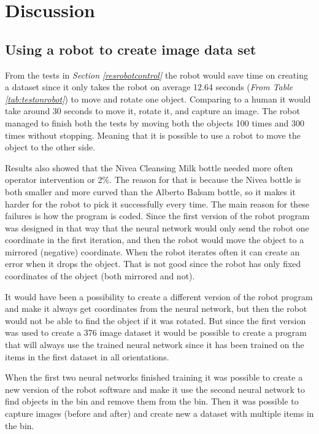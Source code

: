 \chapter{Discussion}

\section{Using a robot to create image data set}
From the tests in \textit{Section \ref{resrobotcontrol}} the robot would save time on creating a dataset since it only takes the robot on average 12.64 seconds (\textit{From Table \ref{tab:testonrobot}}) to move and rotate one object. Comparing to a human it would take around 30 seconds to move it, rotate it, and capture an image. The robot managed to finish both the tests by moving both the objects 100 times and 300 times without stopping. Meaning that it is possible to use a robot to move the object to the other side. 

Results also showed that the Nivea Cleansing Milk bottle needed more often operator intervention or 2\%. The reason for that is because the Nivea bottle is both smaller and more curved than the Alberto Balsam bottle, so it makes it harder for the robot to pick it successfully every time. The main reason for these failures is how the program is coded. Since the first version of the robot program was designed in that way that the neural network would only send the robot one coordinate in the first iteration, and then the robot would move the object to a mirrored (negative) coordinate. When the robot iterates often it can create an error when it drops the object. That is not good since the robot has only fixed coordinates of the object (both mirrored and not).

It would have been a possibility to create a different version of the robot program and make it always get coordinates from the neural network, but then the robot would not be able to find the object if it was rotated. But since the first version was used to create a 376 image dataset it would be possible to create a program that will always use the trained neural network since it has been trained on the items in the first dataset in all orientations.

When the first two neural networks finished training it was possible to create a new version of the robot software and make it use the second neural network to find objects in the bin and remove them from the bin. Then it was possible to capture images (before and after) and create new a dataset with multiple items in the bin.

